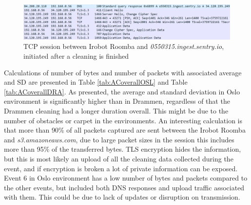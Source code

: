\begin{figure}[H]
    \centering
    \includegraphics[width=\textwidth]{figures/irobot_AC_DNSimgset.png}
    \caption{TCP session between Irobot Roomba and \textit{0550315.ingest.sentry.io}, initiated after a cleaning is finished}
    \label{fig:AC_DNS_ingest}
\end{figure}


Calculations of number of bytes and  number of packets with associated average and \gls{SD} are presented in Table \ref{tab:ACoverallOSL} and Table \ref{tab:ACoverallDRA}. As presented, the average and standard deviation in Oslo environment is significantly higher than in Drammen, regardless of that the Drammen cleaning had a longer duration overall. This might be due to the number of obstacles or carpet in the environments. An interesting calculation is that more than 90\% of all packets captured are sent between the Irobot Roomba and \textit{s3.amazoneaws.com}, due to large packet sizes in the session this includes more than 95\% of the transferred bytes. \gls{TLS} encryption hides the information, but this is most likely an upload of all the cleaning data collected during the event, and if encryption is broken a lot of private information can be exposed. Event 6 in Oslo environment has a low number of bytes and packets compared to the other events, but included both \gls{DNS} responses and upload traffic associated with them. This could be due to lack of updates or disruption on transmission. 

